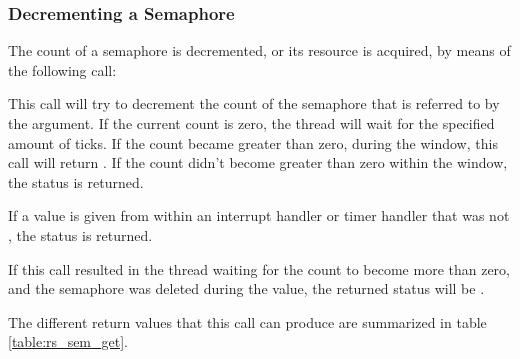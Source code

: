 
\subsubsection{Decrementing a Semaphore}

The count of a semaphore is decremented, or its resource is acquired, by means of the following call:


This call will try to decrement the count of the semaphore that is referred to by the
 argument. If the current count is zero, the thread will wait for the
specified amount of  ticks. If the count became greater than zero, during the
 window, this call will return . If the count didn't become
greater than zero within the  window, the status  is returned. 

If a  value is given from within an interrupt handler or timer handler that was not
, the status  is returned.

If this call resulted in the thread waiting for the count to become more
than zero, and the semaphore was deleted during the  value, the
returned status will be .

The different return values that this call can produce are summarized in
table \ref{table:rs_sem_get}.

